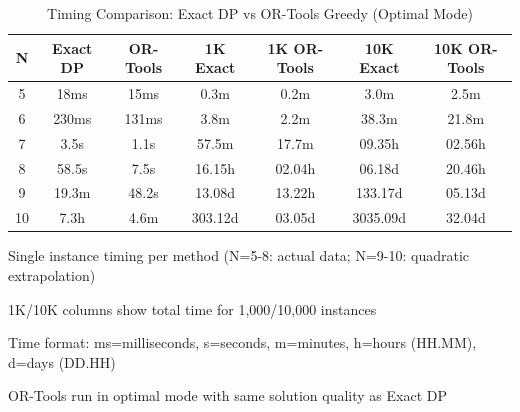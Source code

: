 \documentclass[a4paper,twoside]{article}
\begin{document}
\begin{table}[htbp]
\centering
\caption{Timing Comparison: Exact DP vs OR-Tools Greedy (Optimal Mode)}
\label{tab:timing-comparison}
\small
\begin{tabular}{@{}c c c c c c c@{}}
\toprule
\textbf{N} & \textbf{Exact DP} & \textbf{OR-Tools} & \textbf{1K Exact} & \textbf{1K OR-Tools} & \textbf{10K Exact} & \textbf{10K OR-Tools} \\
\midrule
5 & 18ms & 15ms & 0.3m & 0.2m & 3.0m & 2.5m \\
6 & 230ms & 131ms & 3.8m & 2.2m & 38.3m & 21.8m \\
7 & 3.5s & 1.1s & 57.5m & 17.7m & 09.35h & 02.56h \\
8 & 58.5s & 7.5s & 16.15h & 02.04h & 06.18d & 20.46h \\
\midrule
9 & 19.3m & 48.2s & 13.08d & 13.22h & 133.17d & 05.13d \\
10 & 7.3h & 4.6m & 303.12d & 03.05d & 3035.09d & 32.04d \\
\bottomrule
\end{tabular}
\begin{tablenotes}
\small
\item Single instance timing per method (N=5-8: actual data; N=9-10: quadratic extrapolation)
\item 1K/10K columns show total time for 1,000/10,000 instances
\item Time format: ms=milliseconds, s=seconds, m=minutes, h=hours (HH.MM), d=days (DD.HH)
\item OR-Tools run in optimal mode with same solution quality as Exact DP
\end{tablenotes}
\end{table}
\end{document}
